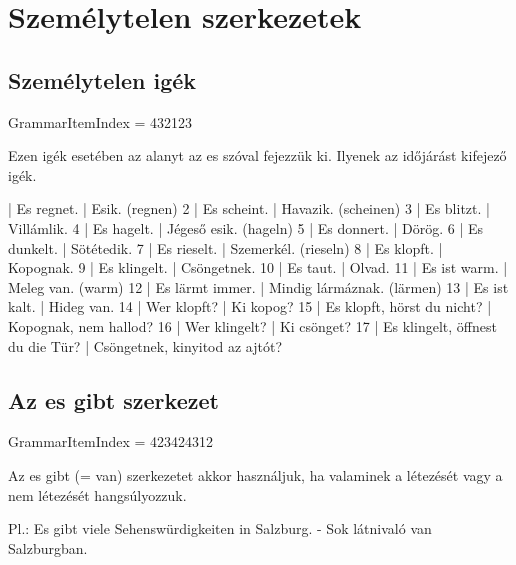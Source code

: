 \documentclass{article}
\newenvironment{desc}{\verbatim}{\endverbatim}
\newenvironment{exmp}{\verbatim}{\endverbatim}
\begin{document}
\section{Személytelen szerkezetek}

\subsection{Személytelen igék}

GrammarItemIndex = 432123

\begin{desc}
Ezen igék esetében az alanyt az es szóval fejezzük ki. Ilyenek az időjárást kifejező igék.
\end{desc}

\begin{exmp}
1 | Es regnet. | Esik. (regnen)
2 | Es scheint. | Havazik. (scheinen)
3 | Es blitzt. | Villámlik.
4 | Es hagelt. | Jégeső esik. (hageln)
5 | Es donnert. | Dörög.
6 | Es dunkelt. | Sötétedik.
7 | Es rieselt. | Szemerkél. (rieseln)
8 | Es klopft. | Kopognak.
9 | Es klingelt. | Csöngetnek.
10 | Es taut. | Olvad.
11 | Es ist warm. | Meleg van. (warm)
12 | Es lärmt immer. | Mindig lármáznak. (lärmen)
13 | Es ist kalt. | Hideg van.
14 | Wer klopft? | Ki kopog?
15 | Es klopft, hörst du nicht? | Kopognak, nem hallod?
16 | Wer klingelt? | Ki csönget?
17 | Es klingelt, öffnest du die Tür? | Csöngetnek, kinyitod az ajtót?
\end{exmp}

\subsection{Az es gibt szerkezet}

GrammarItemIndex = 423424312

\begin{desc}
Az es gibt (= van) szerkezetet akkor használjuk, ha valaminek a létezését vagy a nem létezését hangsúlyozzuk.

Pl.: Es gibt viele Sehenswürdigkeiten in Salzburg. - Sok látnivaló van Salzburgban.
\end{desc}
\end{document}
